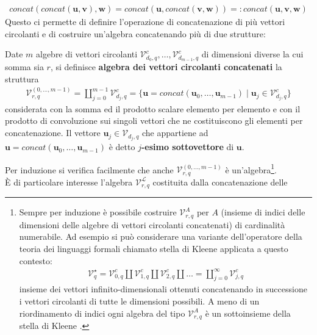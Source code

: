 \begin{align*}
      concat( concat(\mathbf{u},\mathbf{v}),\mathbf{w} )
      = concat( \mathbf{u},concat( \mathbf{v},\mathbf{w} )) =: concat(\mathbf{u}, \mathbf{v},\mathbf{w})
\end{align*}
Questo ci permette di definire l'operazione di concatenazione di più vettori circolanti e di costruire un'algebra concatenando più di due strutture:
\begin{definizione}
   Date $m$ algebre di vettori circolanti $\mathcal{V}_{d_{0}, q}^{c} ,\dots , \mathcal{V}_{d_{m-1}, q}^{c} $ di dimensioni diverse la cui somma sia $r$, si definisce {\bf algebra dei vettori circolanti concatenati} la struttura
   \begin{align*}
      \mathcal{V}_{r,q}^{(0,\dots , m-1)} =  \coprod_{j=0}^{m-1} \mathcal{V}_{d_{j}, q}^{c}
      = \lbrace \mathbf{u} = concat(\mathbf{u}_{0}, \dots , \mathbf{u}_{m-1}) \mid \mathbf{u}_{j} \in \mathcal{V}_{d_{j}, q}^{c} \rbrace
   \end{align*}
   considerata con la somma ed il prodotto scalare elemento per elemento e con il prodotto di convoluzione sui singoli vettori che ne costituiscono gli elementi per concatenazione. Il vettore $\mathbf{u}_{j} \in \mathcal{V}_{d_{j},q}$ che appartiene ad $\mathbf{u} = concat(\mathbf{u}_{0}, \dots , \mathbf{u}_{m-1}) $ è detto {\bf $j$-esimo sottovettore} di $\mathbf{u}$.
\end{definizione}
\noindent
Per induzione si verifica facilmente che anche $\mathcal{V}_{r,q}^{(0,\dots , m-1)}$ è un'algebra\footnote{Sempre per induzione è possibile costruire $\mathcal{V}_{r,q}^{A}$ per $A$ (insieme di indici delle dimensioni delle algebre di vettori circolanti concatenati) di cardinalità numerabile. Ad esempio si può considerare una variante dell'operatore della teoria dei linguaggi formali chiamato stella di Kleene applicata a questo contesto:
\begin{align*}
   \mathcal{V}_{q}^{\star}
   = \mathcal{V}_{0, q}^{c} \coprod \mathcal{V}_{1, q}^{c} \coprod \mathcal{V}_{2, q}^{c}\coprod \dots
   = \coprod_{j =0 }^{\infty} \mathcal{V}_{j, q}^{c}
\end{align*}
insieme dei vettori infinito-dimensionali ottenuti concatenando in successione i vettori circolanti di tutte le dimensioni possibili. A meno di un riordinamento di indici ogni algebra del tipo $\mathcal{V}_{r,q}^{A}$ è un sottoinsieme della stella di Kleene \cite{difebbraro}.
}.\\
È di particolare interesse l'algebra $\mathcal{V}_{r,q}^{\mathscr{L}}$ costituita dalla concatenazione delle
